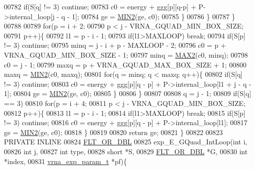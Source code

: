 \begin{DoxyCode}
00782         \textcolor{keywordflow}{if}(S[q] != 3) \textcolor{keywordflow}{continue};
00783         c0  = energy + ggg[p][q-p] + P->internal\_loop[j - q - 1];
00784         ge  = \hyperlink{group__utils_ga2dd4a927a7f937f43a90c144d79107d8}{MIN2}(ge, c0);
00785       \}
00786     \}
00787   \}
00788 
00789   \textcolor{keywordflow}{for}(p = i + 2;
00790       p < j - VRNA\_GQUAD\_MIN\_BOX\_SIZE;
00791       p++)\{
00792     l1    = p - i - 1;
00793     \textcolor{keywordflow}{if}(l1>MAXLOOP) \textcolor{keywordflow}{break};
00794     \textcolor{keywordflow}{if}(S[p] != 3) \textcolor{keywordflow}{continue};
00795     minq  = j - i + p - MAXLOOP - 2;
00796     c0    = p + VRNA\_GQUAD\_MIN\_BOX\_SIZE - 1;
00797     minq  = \hyperlink{group__utils_gadd91367918fadbc8d585940d6206d6d2}{MAX2}(c0, minq);
00798     c0    = j - 1;
00799     maxq  = p + VRNA\_GQUAD\_MAX\_BOX\_SIZE + 1;
00800     maxq  = \hyperlink{group__utils_ga2dd4a927a7f937f43a90c144d79107d8}{MIN2}(c0, maxq);
00801     \textcolor{keywordflow}{for}(q = minq; q < maxq; q++)\{
00802       \textcolor{keywordflow}{if}(S[q] != 3) \textcolor{keywordflow}{continue};
00803       c0  = energy + ggg[p][q - p] + P->internal\_loop[l1 + j - q - 1];
00804       ge   = \hyperlink{group__utils_ga2dd4a927a7f937f43a90c144d79107d8}{MIN2}(ge, c0);
00805     \}
00806   \}
00807 
00808   q = j - 1;
00809   \textcolor{keywordflow}{if}(S[q] == 3)
00810     \textcolor{keywordflow}{for}(p = i + 4;
00811         p < j - VRNA\_GQUAD\_MIN\_BOX\_SIZE;
00812         p++)\{
00813       l1    = p - i - 1;
00814       \textcolor{keywordflow}{if}(l1>MAXLOOP) \textcolor{keywordflow}{break};
00815       \textcolor{keywordflow}{if}(S[p] != 3) \textcolor{keywordflow}{continue};
00816       c0  = energy + ggg[p][q - p] + P->internal\_loop[l1];
00817       ge  = \hyperlink{group__utils_ga2dd4a927a7f937f43a90c144d79107d8}{MIN2}(ge, c0);
00818     \}
00819 
00820   \textcolor{keywordflow}{return} ge;
00821 \}
00822 
00823 PRIVATE INLINE
00824 \hyperlink{group__data__structures_ga31125aeace516926bf7f251f759b6126}{FLT\_OR\_DBL}
00825 exp\_E\_GQuad\_IntLoop(\textcolor{keywordtype}{int} i,
00826                     \textcolor{keywordtype}{int} j,
00827                     \textcolor{keywordtype}{int} type,
00828                     \textcolor{keywordtype}{short} *S,
00829                     \hyperlink{group__data__structures_ga31125aeace516926bf7f251f759b6126}{FLT\_OR\_DBL} *G,
00830                     \textcolor{keywordtype}{int} *index,
00831                     \hyperlink{group__energy__parameters_structvrna__exp__param__s}{vrna\_exp\_param\_t} *pf)\{

\end{DoxyCode}
